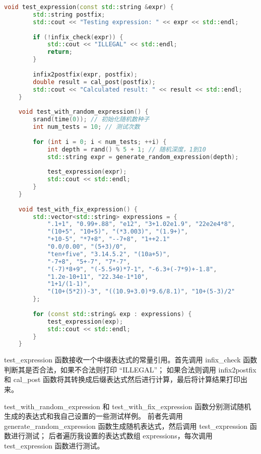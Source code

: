 \documentclass[UTF8]{ctexart}
\begin{document}
\begin{lstlisting}[language=c++, breaklines=true, frame=shadowbox, rulesepcolor=\color{red!20!green!20!blue!20}]
    void test_expression(const std::string &expr) {
        std::string postfix;
        std::cout << "Testing expression: " << expr << std::endl;
    
        if (!infix_check(expr)) {
            std::cout << "ILLEGAL" << std::endl;
            return;
        }
    
        infix2postfix(expr, postfix);
        double result = cal_post(postfix);
        std::cout << "Calculated result: " << result << std::endl;
    }
    
    void test_with_random_expression() {
        srand(time(0)); // 初始化随机数种子
        int num_tests = 10; // 测试次数
    
        for (int i = 0; i < num_tests; ++i) {
            int depth = rand() % 5 + 1; // 随机深度，1到10
            std::string expr = generate_random_expression(depth);
    
            test_expression(expr);
            std::cout << std::endl;
        }
    }
    
    void test_with_fix_expression() {
        std::vector<std::string> expressions = {
            ".1+1", "0.99+.88", "e12", "3+1.02e1.9", "22e2e4*8", 
            "(10+5", "10+5)", "(*3.003)", "(1.9+)", 
            "+10-5", "*7+8", "--7+8", "1++2.1"
            "0.0/0.00", "(5+3)/0", 
            "ten+five", "3.14.5.2", "(10a+5)", 
            "-7+8", "5+-7", "7*-7", 
            "(-7)*8+9", "(-5.5+9)*7-1", "-6.3+(-7*9)+-1.8", 
            "1.2e-10+11", "22.34e-1*10", 
            "1+1/(1-1)", 
            "(10+(5*2))-3", "((10.9+3.0)*9.6/8.1)", "10+(5-3)/2"
        };
    
        for (const std::string& exp : expressions) {
            test_expression(exp);
            std::cout << std::endl;
        }
    }
\end{lstlisting}

test\_expression 函数接收一个中缀表达式的常量引用。首先调用 infix\_check 函数判断其是否合法，如果不合法则打印 “ILLEGAL”；
如果合法则调用 infix2postfix 和 cal\_post 函数将其转换成后缀表达式然后进行计算，最后将计算结果打印出来。

test\_with\_random\_expression 和 test\_with\_fix\_expression 函数分别测试随机生成的表达式和我自己设置的一些测试样例。
前者先调用 generate\_random\_expression 函数生成随机表达式，然后调用 test\_expression 函数进行测试；
后者遍历我设置的表达式数组 expressions，每次调用 test\_expression 函数进行测试。
\end{document}
